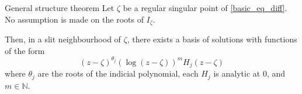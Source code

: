 \documentclass[../main.tex]{subfiles}
\begin{document}
\begin{thm}{General structure theorem}
	Let $\zeta$ be a regular singular point of \eqref{basic_eq_diff}. No assumption is made on the roots of $I_\zeta$.
	
	Then, in a slit neighbourhood of $\zeta$, there exists a basis of solutions with functions of the form
	\begin{equation}\label{general_structure_form}
	{(z - \zeta)}^{\theta_j} {(\log (z - \zeta))}^m H_j (z - \zeta)
	\end{equation}
	where $\theta_j$ are the roots of the indicial polynomial, each $H_j$ is analytic at 0, and $m \in \mathbb{N}$. 
\end{thm}



\end{document}
